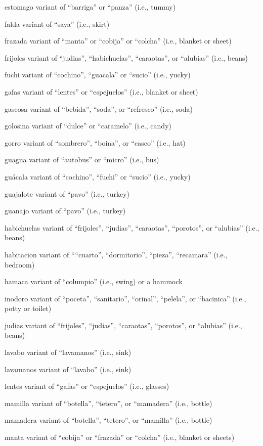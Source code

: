 \documentclass[
]{book}
\begin{document}
estomago
variant of ``barriga'' or ``panza'' (i.e., tummy)

falda
variant of ``saya'' (i.e., skirt)

frazada
variant of ``manta'' or ``cobija'' or ``colcha'' (i.e., blanket or sheet)

frijoles
variant of ``judias'', ``habichuelas'', ``caraotas'', or ``alubias'' (i.e., beans)

fuchi
variant of ``cochino'', ``guacala'' or ``sucio'' (i.e., yucky)

gafas
variant of ``lentes'' or ``espejuelos'' (i.e., blanket or sheet)

gaseosa
variant of ``bebida'', ``soda'', or ``refresco'' (i.e., soda)

golosina
variant of ``dulce'' or ``caramelo'' (i.e., candy)

gorro
variant of ``sombrero'', ``boina'', or ``casco'' (i.e., hat)

guagua
variant of ``autobus'' or ``micro'' (i.e., bus)

guácala
variant of ``cochino'', ``fuchi'' or ``sucio'' (i.e., yucky)

guajalote
variant of ``pavo'' (i.e., turkey)

guanajo
variant of ``pavo'' (i.e., turkey)

habichuelas
variant of ``frijoles'', ``judias'', ``caraotas'', ``porotos'', or ``alubias'' (i.e., beans)

habitacion
variant of ````cuarto'', ``dormitorio'', ``pieza'', ``recamara'' (i.e., bedroom)

hamaca
variant of ``columpio'' (i.e., swing) or a hammock

inodoro
variant of ``poceta'', ``sanitario'', ``orinal'', ``pelela'', or ``bacinica'' (i.e., potty or toilet)

judias
variant of ``frijoles'', ``judias'', ``caraotas'', ``porotos'', or ``alubias'' (i.e., beans)

lavabo
variant of ``lavamanos'' (i.e., sink)

lavamanos
variant of ``lavabo'' (i.e., sink)

lentes
variant of ``gafas'' or ``espejuelos'' (i.e., glasses)

mamilla
variant of ``botella'', ``tetero'', or ``mamadera'' (i.e., bottle)

mamadera
variant of ``botella'', ``tetero'', or ``mamilla'' (i.e., bottle)

manta
variant of ``cobija'' or ``frazada'' or ``colcha'' (i.e., blanket or sheets)
\end{document}
